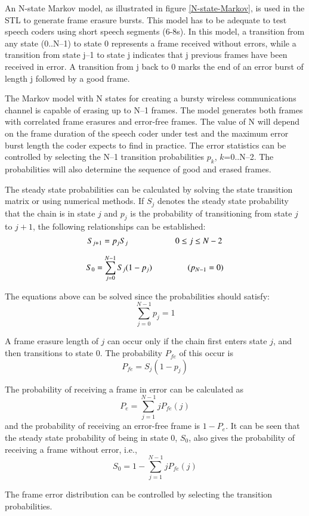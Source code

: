 An N-state Markov model, as illustrated in figure \ref{N-state-Markov}, is
used in the STL to generate frame erasure bursts. This model has to be
adequate to test speech coders using short speech segments (6-8s). In this
model, a transition from any state (0..N--1) to state 0 represents a frame
received without errors, while a transition from state j--1 to state j
indicates that j previous frames have been received in error. A transition
from j back to 0 marks the end of an error burst of length j followed by a
good frame.

The Markov model with N states for creating a bursty wireless communications
channel is capable of erasing up to N--1 frames. The model generates both
frames with correlated frame erasures and error-free frames. The value of N
will depend on the frame duration of the speech coder under test and the
maximum error burst length the coder expects to find in practice. The error
statistics can be controlled by selecting the N--1 transition probabilities
$p_k$, $k$=0..N--2. The probabilities will also determine the sequence of
good and erased frames.

The steady state probabilities can be calculated by solving the state
transition matrix or using numerical methods. If $S_j$
denotes the steady state probability that the chain is in state
$j$ and $p_j$ is the probability of transitioning from state $j$ to $j+1$,
the following relationships can be established:
\[
    S_{j+1} = p_j S_j \mbox{\rule{20mm}{0mm}} 0 \le j \le N-2
\]

\[
   S_0 = \sum_{j=0}^{N-1} S_j (1-p_j) \mbox{\rule{15mm}{0mm}} (p_{N-1}=0)
\]

The equations above can be solved since the probabilities should satisfy:
\[
   \sum_{j=0}^{N-1} p_j = 1
\]

A frame erasure length of $j$ can occur only if the chain first enters state
$j$, and then transitions to state 0. The probability $P_{fe}$ of this
occur is
\[
   P_{fe} = S_j (1-p_j)
\]

The probability of receiving a frame in error can be calculated as
\[
   P_e = \sum_{j=1}^{N-1} j P_{fe}(j)
\]
and the probability of receiving an error-free frame is $1-P_e$. It
can be seen that the steady state probability of being in state 0, $S_0$,
also gives the probability of receiving a frame without error, i.e.,
\[
  S_0 = 1 - \sum_{j=1}^{N-1} j P_{fe}(j)
\]

The frame error distribution can be controlled by selecting the transition
probabilities.

